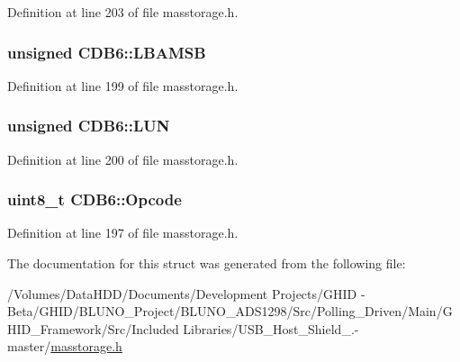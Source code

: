 \-Definition at line 203 of file masstorage.\-h.

\hypertarget{struct_c_d_b6_a1d5e2c34147b5ecc84d20f10e307fd1e}{
\subsubsection[{\-L\-B\-A\-M\-S\-B}]{\setlength{\rightskip}{0pt plus 5cm}unsigned {\bf \-C\-D\-B6\-::\-L\-B\-A\-M\-S\-B}}}\label{struct_c_d_b6_a1d5e2c34147b5ecc84d20f10e307fd1e}


\-Definition at line 199 of file masstorage.\-h.

\hypertarget{struct_c_d_b6_ada1275c63867c75daf71348ec1f8d666}{
\subsubsection[{\-L\-U\-N}]{\setlength{\rightskip}{0pt plus 5cm}unsigned {\bf \-C\-D\-B6\-::\-L\-U\-N}}}\label{struct_c_d_b6_ada1275c63867c75daf71348ec1f8d666}


\-Definition at line 200 of file masstorage.\-h.

\hypertarget{struct_c_d_b6_af2b06ea02758f3096f48da306371a7d8}{
\subsubsection[{\-Opcode}]{\setlength{\rightskip}{0pt plus 5cm}uint8\-\_\-t {\bf \-C\-D\-B6\-::\-Opcode}}}\label{struct_c_d_b6_af2b06ea02758f3096f48da306371a7d8}


\-Definition at line 197 of file masstorage.\-h.



\-The documentation for this struct was generated from the following file\-:\begin{DoxyCompactItemize}
\item 
/\-Volumes/\-Data\-H\-D\-D/\-Documents/\-Development Projects/\-G\-H\-I\-D -\/ Beta/\-G\-H\-I\-D/\-B\-L\-U\-N\-O\-\_\-\-Project/\-B\-L\-U\-N\-O\-\_\-\-A\-D\-S1298/\-Src/\-Polling\-\_\-\-Driven/\-Main/\-G\-H\-I\-D\-\_\-\-Framework/\-Src/\-Included Libraries/\-U\-S\-B\-\_\-\-Host\-\_\-\-Shield\-\_.-\/master/\hyperlink{masstorage_8h}{masstorage.\-h}\end{DoxyCompactItemize}
